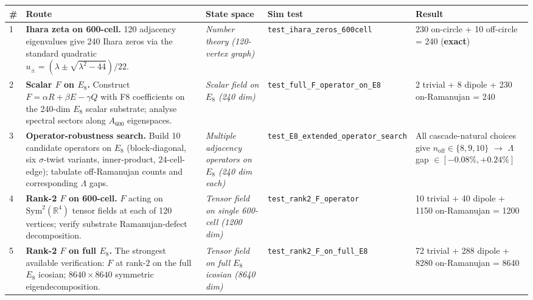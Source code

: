 \documentclass[11pt]{article}
\theoremstyle{plain}
\theoremstyle{definition}
\theoremstyle{remark}
\begin{document}
\begin{center}
\renewcommand{\arraystretch}{1.35}
\begin{tabular}{p{0.4cm} p{4.2cm} p{3.5cm} p{2.5cm} l}
\toprule
\textbf{\#} & \textbf{Route} & \textbf{State space} & \textbf{Sim test} & \textbf{Result} \\
\midrule
1 & \textbf{Ihara zeta on 600-cell.} 120 adjacency eigenvalues give 240 Ihara zeros via the standard quadratic $u_\pm = (\lambda \pm \sqrt{\lambda^2 - 44})/22$. & \textit{Number theory (120-vertex graph)} & \texttt{test\_ihara\_zeros\_600cell} & 230 on-circle + 10 off-circle = 240 (\textbf{exact}) \\
2 & \textbf{Scalar $F$ on $E_8$.} Construct $F = \alpha R + \beta E - \gamma Q$ with F8 coefficients on the 240-dim $E_8$ scalar substrate; analyse spectral sectors along $A_{600}$ eigenspaces. & \textit{Scalar field on $E_8$ (240 dim)} & \texttt{test\_full\_F\_operator\_on\_E8} & 2 trivial + 8 dipole + 230 on-Ramanujan = 240 \\
3 & \textbf{Operator-robustness search.} Build 10 candidate operators on $E_8$ (block-diagonal, six $\sigma$-twist variants, inner-product, $24$-cell-edge); tabulate off-Ramanujan counts and corresponding $\Lambda$ gaps. & \textit{Multiple adjacency operators on $E_8$ (240 dim each)} & \texttt{test\_E8\_extended\_operator\_search} & All cascade-natural choices give $n_\mathrm{off} \in \{8, 9, 10\}$ $\rightarrow$ $\Lambda$ gap $\in [-0.08\%, +0.24\%]$ \\
4 & \textbf{Rank-2 $F$ on 600-cell.} $F$ acting on $\mathrm{Sym}^2(\mathbb{R}^4)$ tensor fields at each of 120 vertices; verify substrate Ramanujan-defect decomposition. & \textit{Tensor field on single 600-cell (1200 dim)} & \texttt{test\_rank2\_F\_operator} & 10 trivial + 40 dipole + 1150 on-Ramanujan = 1200 \\
5 & \textbf{Rank-2 $F$ on full $E_8$.} The strongest available verification: $F$ at rank-$2$ on the full $E_8$ icosian; $8640 \times 8640$ symmetric eigendecomposition. & \textit{Tensor field on full $E_8$ icosian (8640 dim)} & \texttt{test\_rank2\_F\_on\_full\_E8} & 72 trivial + 288 dipole + 8280 on-Ramanujan = 8640 \\
\bottomrule
\end{tabular}
\end{center}
\end{document}

